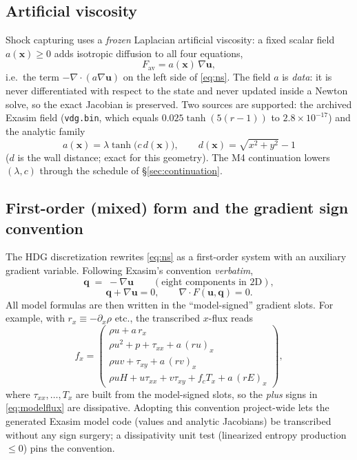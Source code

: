 \documentclass[11pt]{article}
\newcommand{\bu}{\mathbf{u}}
\newcommand{\bq}{\mathbf{q}}
\newcommand{\bx}{\mathbf{x}}
\newcommand{\code}[1]{\texttt{#1}}
\begin{document}
\subsection{Artificial viscosity}
\label{sec:av}

Shock capturing uses a \emph{frozen} Laplacian artificial viscosity: a fixed
scalar field $a(\bx)\ge 0$ adds isotropic diffusion to all four equations,
\begin{equation}
F_{\mathrm{av}} = a(\bx)\,\nabla\bu ,
\end{equation}
i.e.\ the term $-\nabla\cdot(a\nabla\bu)$ on the left side of \eqref{eq:ns}.
The field $a$ is \emph{data}: it is never differentiated with respect to the
state and never updated inside a Newton solve, so the exact Jacobian is
preserved. Two sources are supported: the archived Exasim field
(\code{vdg.bin}, which equals $0.025\tanh(5(r-1))$ to $2.8\times10^{-17}$) and
the analytic family
\begin{equation}
a(\bx) = \lambda \tanh\!\bigl(c\,d(\bx)\bigr),
\qquad d(\bx) = \sqrt{x^2+y^2} - 1
\end{equation}
($d$ is the wall distance; exact for this geometry). The M4 continuation
lowers $(\lambda, c)$ through the schedule of \S\ref{sec:continuation}.

\subsection{First-order (mixed) form and the gradient sign convention}

The HDG discretization rewrites \eqref{eq:ns} as a first-order system with an
auxiliary gradient variable. Following Exasim's convention \emph{verbatim},
\begin{equation}
\bq \;=\; -\nabla \bu \qquad (\text{eight components in 2D}),
\end{equation}
\begin{equation}
\bq + \nabla\bu = 0, \qquad
\nabla\cdot F(\bu, \bq) = 0 .
\end{equation}
All model formulas are then written in the ``model-signed'' gradient slots.
For example, with $r_x \equiv -\partial_x\rho$ etc., the transcribed
$x$-flux reads
\begin{equation}
f_x = \begin{pmatrix}
\rho u + a\,r_x\\[2pt]
\rho u^2 + p + \tau_{xx} + a\,(ru)_x\\[2pt]
\rho u v + \tau_{xy} + a\,(rv)_x\\[2pt]
\rho u H + u\tau_{xx} + v\tau_{xy} + f_c T_x + a\,(rE)_x
\end{pmatrix},
\label{eq:modelflux}
\end{equation}
where $\tau_{xx},\dots,T_x$ are built from the model-signed slots, so the
\emph{plus} signs in \eqref{eq:modelflux} are dissipative. Adopting this
convention project-wide lets the generated Exasim model code (values and
analytic Jacobians) be transcribed without any sign surgery; a dissipativity
unit test (linearized entropy production $\le 0$) pins the convention.
\end{document}
